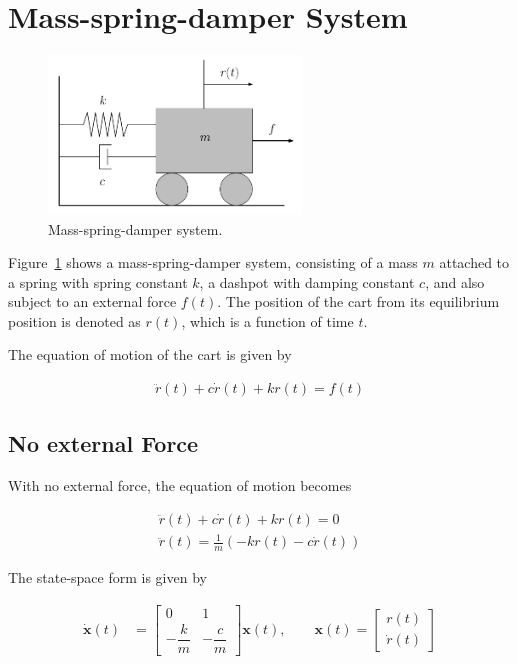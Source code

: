 \section{Mass-spring-damper System}

\begin{figure}[h]
    \centering
    \includegraphics[width=0.6\textwidth]{figures/mass_spring_damper.png}
    \caption{Mass-spring-damper system.}
    \label{fig:mass_spring_damper}
\end{figure}

Figure~\ref{fig:mass_spring_damper} shows a mass-spring-damper system, 
consisting of a mass \( m \) attached to a spring with spring constant \( k \), 
a dashpot with damping constant \( c \), and also subject to an external force \( f(t) \). 
The position of the cart from its equilibrium position is denoted as \( r(t) \), 
which is a function of time \( t \).

The equation of motion of the cart is given by

\begin{align}
    \ddot{r}(t) + c\dot{r}(t) + kr(t) = f(t)
\end{align}
\clearpage

\subsection{No external Force}

With no external force, the equation of motion becomes

\begin{align}
    \ddot{r}(t) + c\dot{r}(t) + kr(t) = 0 \\
    \ddot{r}(t) = \frac{1}{m}(-k r(t) - c \dot{r}(t))
\end{align}

The state-space form is given by
 
\begin{equation}
    \begin{aligned}
        \dot{\mathbf{x}}(t) &= 
        \begin{bmatrix}
            0 & 1 \\
            -\dfrac{k}{m} & -\dfrac{c}{m}
        \end{bmatrix}
        \mathbf{x}(t), \quad\quad
        \mathbf{x}(t) = 
        \begin{bmatrix}
            r(t) \\
            \dot{r}(t)
        \end{bmatrix}
    \end{aligned}
    \end{equation}

